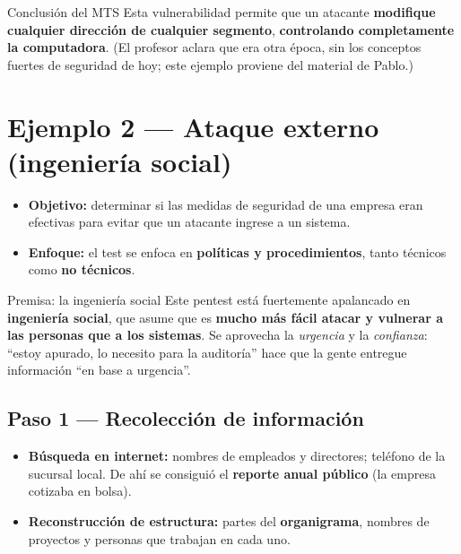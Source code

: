 \documentclass[11pt,a4paper]{article}
\newcommand{\factor}[1]{\textcolor{itbaCyanDark}{\textbf{#1}}}
\begin{document}
\begin{warnbox}{Conclusión del MTS}
Esta vulnerabilidad permite que un atacante \textbf{modifique cualquier dirección de cualquier
segmento}, \textbf{controlando completamente la computadora}. (El profesor aclara que era otra
época, sin los conceptos fuertes de seguridad de hoy; este ejemplo proviene del material de
Pablo.)
\end{warnbox}

\section{Ejemplo 2 — Ataque externo (ingeniería social)}

\begin{itemize}[leftmargin=1.6em,itemsep=2pt]
  \item \textbf{Objetivo:} determinar si las medidas de seguridad de una empresa eran
        efectivas para evitar que un atacante ingrese a un sistema.
  \item \textbf{Enfoque:} el test se enfoca en \textbf{políticas y procedimientos}, tanto
        técnicos como \textbf{no técnicos}.
\end{itemize}

\begin{warnbox}{Premisa: la ingeniería social}
Este pentest está fuertemente apalancado en \factor{ingeniería social}, que asume que es
\textbf{mucho más fácil atacar y vulnerar a las personas que a los sistemas}. Se aprovecha la
\emph{urgencia} y la \emph{confianza}: ``estoy apurado, lo necesito para la auditoría'' hace
que la gente entregue información ``en base a urgencia''.
\end{warnbox}

\subsection{Paso 1 — Recolección de información}

\begin{itemize}[leftmargin=1.6em,itemsep=2pt]
  \item \textbf{Búsqueda en internet:} nombres de empleados y directores; teléfono de la
        sucursal local. De ahí se consiguió el \textbf{reporte anual público} (la empresa
        cotizaba en bolsa).
  \item \textbf{Reconstrucción de estructura:} partes del \textbf{organigrama}, nombres de
        proyectos y personas que trabajan en cada uno.
\end{itemize}
\end{document}
